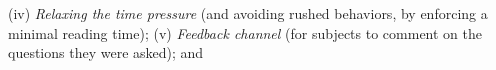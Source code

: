 \documentclass[a4paper,fleqn]{cas-dc}
\begin{document}
(iv)
  \emph{Relaxing the time pressure} (and avoiding rushed behaviors, by enforcing a minimal reading time);
(v)
  \emph{Feedback channel} (for subjects to comment on the
  questions they were asked); and
\end{document}
